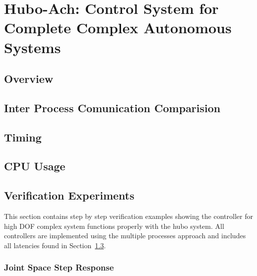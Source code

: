 \chapter{Hubo-Ach: Control System for Complete Complex Autonomous Systems}\label{sec:hubo-ach}

\section{Overview}




\section{Inter Process Comunication Comparision}\label{sec:ipc}
	
\section{Timing}\label{sec:timing}
	
\section{CPU Usage}
	
\section{Verification Experiments}\label{sec:simpleExamples}
This section contains step by step verification examples showing the controller for high DOF complex system functions properly with the hubo system.
All controllers are implemented using the multiple processes approach and includes all latencies found in Section~\ref{sec:timing}.

	\subsection{Joint Space Step Response}\label{sec:singlejointStep}
		
